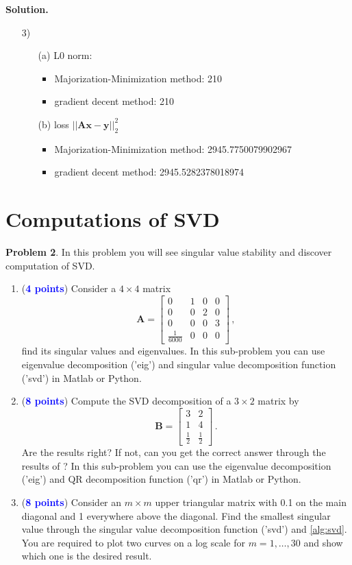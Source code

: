 \documentclass[english,onecolumn]{IEEEtran}
\begin{document}
\noindent
\textbf{Solution.}
\begin{enumerate}
    \item[3)] \begin{enumerate}
        \item[(a)] L0 norm: \begin{itemize}
            \item Majorization-Minimization method: 210
            \item gradient decent method: 210
        \end{itemize}
        \item[(b)] loss $||\mathbf{Ax-y}||^{2}_{2}$
        \begin{itemize}
            \item Majorization-Minimization method: 2945.7750079902967
            \item gradient decent method: 2945.5282378018974
        \end{itemize}
    \end{enumerate}
\end{enumerate}


\newpage
\section{Computations of SVD}
\noindent\textbf{Problem 2}.
In this problem you will see singular value stability and discover computation of SVD.
\begin{enumerate}
    \item (\textcolor{blue}{\textbf{4 points}}) Consider a $4 \times 4$ matrix
    \[
	\mathbf{A} = \begin{bmatrix}
		0& 1&0&0 \\
		0&0&2&0\\
		0&0&0&3\\
		\frac{1}{6000}&0&0&0
	\end{bmatrix}\,,
	\]
	find its singular values and eigenvalues. In this sub-problem you can use eigenvalue decomposition ('eig') and singular value decomposition function ('svd') in Matlab or Python.
	\item (\textcolor{blue}{\textbf{8 points}}) Compute the SVD decomposition of a $3 \times 2$ matrix by 
	\[
	\mathbf{B} = \begin{bmatrix}
		3& 2 \\
		1&4  \\
		\frac{1}{2}&\frac{1}{2}
	\end{bmatrix}\,.
	\]
Are the results right? If not, can you get the correct answer through the results of ? In this sub-problem you can use the eigenvalue decomposition ('eig') and QR decomposition function ('qr') in Matlab or Python.
\item (\textcolor{blue}{\textbf{8 points}}) Consider an $m\times m$ upper triangular matrix with 0.1 on the main diagonal and 1 everywhere above the diagonal. Find the smallest singular value through the singular value decomposition function ('svd') and \cref{alg:svd}. You are required to plot two curves on a log scale for $m=1,\dots,30$ and show which one is the desired result.
\end{enumerate}
\end{document}
